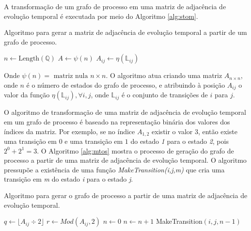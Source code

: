 \documentclass[12pt,a4paper]{article}
\begin{document}
A transformação de um grafo de processo em uma matriz de adjacência
de evolução temporal é executada por meio do Algoritmo \ref{alg:stom}.

\begin{algorithm}
\caption{Algoritmo para gerar a matriz de adjacência de evolução temporal a partir
de um grafo de processo.}
\label{alg:stom}
\begin{algorithmic}
\STATE $n \leftarrow \mbox{Length}(\mathbb{Q})$ 
\STATE $A \leftarrow \psi(n)$
        \STATE $A_{ij} \leftarrow \eta(\mathbb{\mathbb{L}}_{ij})$
    \ENDIF
\ENDFOR
\end{algorithmic}
\end{algorithm}

Onde $\psi(n) = \mbox{ matriz nula } n \times n$.
O algoritmo atua criando uma matriz $A_{n \times n}$, onde $n$ é o número
de estados do grafo de processo, e atribuindo à posição $A_{ij}$ o valor
da função $\eta(\mathbb{L}_{ij}),\forall i,j$, onde $\mathbb{L}_{ij}$
é o conjunto de transições de $i$ para $j$.

O algoritmo de transformação de uma matriz de adjacência de evolução temporal em
um grafo de processo é baseado na representação binária dos valores dos
índices da matriz. Por exemplo, se no índice $A_{1,2}$ existir o valor
$3$, então existe uma transição em $0$ e uma transição em $1$ do estado
\emph{1} para o estado \emph{2}, pois $2^0+2^1=3$. O Algoritmo \ref{alg:mtos}
mostra o processo de geração do grafo de processo a partir de uma matriz de
adjacência de evolução temporal. O algoritmo pressupõe a existência de uma função
\emph{MakeTransition(i,j,m)} que cria uma transição em \emph{m} do estado
\emph{i} para o estado \emph{j}.

\begin{algorithm}
\caption{Algoritmo para gerar o grafo de processo a partir de uma matriz de
adjacência de evolução temporal.}
\label{alg:mtos}
\begin{algorithmic}
            \REPEAT
                \STATE $q \leftarrow \lfloor A_{ij} \div 2 \rfloor$
                \STATE $r \leftarrow Mod(A_{ij},2)$
                    \STATE $n \leftarrow 0$
                        \STATE $n \leftarrow n+1$
                    \ENDWHILE
                    \STATE MakeTransition$(i,j,n-1)$
                \ENDIF
        \ENDIF
    \ENDFOR
\ENDFOR
\end{algorithmic}
\end{algorithm}
\end{document}
